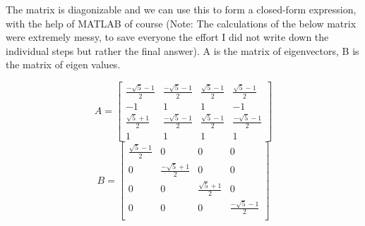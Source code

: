 \documentclass[11pt, letterpaper]{article}
\begin{document}
\begin{enumerate}[label=(\alph*)]
The matrix is diagonizable and we can use this to form a closed-form expression, with the help of MATLAB of course (Note: The calculations of the below matrix were extremely messy, to save everyone the effort I did not write down the individual steps but rather the final answer). A is the matrix of eigenvectors, B is the matrix of eigen values. 

\[
A =
\begin{bmatrix}
\frac{-\sqrt{5} - 1}{2} & \frac{-\sqrt{5} - 1}{2} & \frac{\sqrt{5} - 1}{2} & \frac{\sqrt{5} - 1}{2} \\
-1 & 1 & 1 & -1 \\
\frac{\sqrt{5} + 1}{2} & \frac{-\sqrt{5} - 1}{2} & \frac{\sqrt{5} - 1}{2} & \frac{-\sqrt{5} - 1}{2} \\
1 & 1 & 1 & 1
\end{bmatrix}
\]
\[
B =
\begin{bmatrix}
\frac{\sqrt{5} - 1}{2} & 0 & 0 & 0 \\
0 & \frac{-\sqrt{5} + 1}{2} & 0 & 0 \\
0 & 0 & \frac{\sqrt{5} + 1}{2} & 0 \\
0 & 0 & 0 & \frac{-\sqrt{5} - 1}{2} \\
\end{bmatrix}
\]


\end{enumerate}
\end{document}
